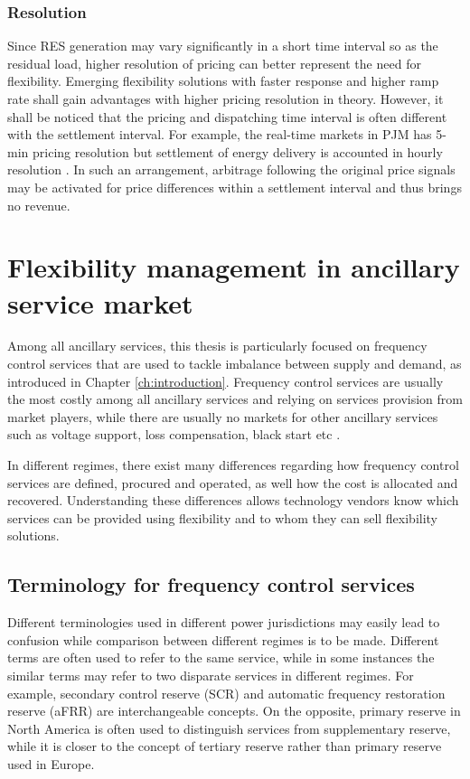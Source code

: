 \subsubsection{Resolution}
Since RES generation may vary significantly in a short time interval so as the residual load, higher resolution of pricing can better represent the need for flexibility. Emerging flexibility solutions with faster response and higher ramp rate shall gain advantages with higher pricing resolution in theory. However, it shall be noticed that the pricing and dispatching time interval is often different with the settlement interval. For example, the real-time markets in PJM has 5-min pricing resolution but settlement of energy delivery is accounted in hourly resolution \cite{PJM2017}. In such an arrangement, arbitrage following the original price signals may be activated for price differences within a settlement interval and thus brings no revenue. 


\section{Flexibility management in ancillary service market}
Among all ancillary services, this thesis is particularly focused on frequency control services that are used to tackle imbalance between supply and demand, as introduced in Chapter \ref{ch:introduction}. Frequency control services are usually the most costly among all ancillary services and relying on services provision from market players, while there are usually no markets for other ancillary services such as voltage support, loss compensation, black start etc \cite{Rebours2009,Cochran2013}. 

In different regimes, there exist many differences regarding how frequency control services are defined, procured and operated, as well how the cost is allocated and recovered. Understanding these differences allows technology vendors know which services can be provided using flexibility and to whom they can sell flexibility solutions.

\subsection{Terminology for frequency control services}

Different terminologies used in different power jurisdictions may easily lead to confusion while comparison between different regimes is to be made. Different terms are often used to refer to the same service, while in some instances the similar terms may refer to two disparate services in different regimes. For example, secondary control reserve (SCR) and automatic frequency restoration reserve (aFRR) are interchangeable concepts. On the opposite, primary reserve in North America is often used to distinguish services from supplementary reserve, while it is closer to the concept of tertiary reserve rather than primary reserve used in Europe.

